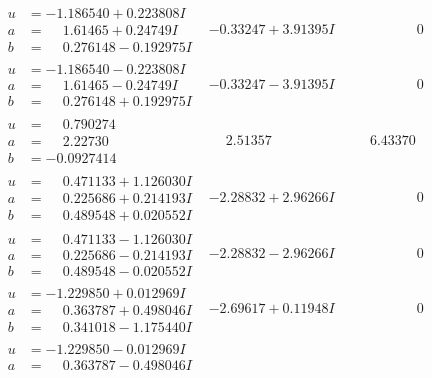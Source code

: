 \documentclass[1p]{elsarticle_modified}
\theoremstyle{definition}
\begin{document}
$$\begin{array}{c|c|c}
\begin{aligned}
u &= -1.186540 + 0.223808 I \\
a &= \phantom{-}1.61465 + 0.24749 I \\
b &= \phantom{-}0.276148 - 0.192975 I\end{aligned}
 & -0.33247 + 3.91395 I & \phantom{-0.000000 } 0 \\ \hline\begin{aligned}
u &= -1.186540 - 0.223808 I \\
a &= \phantom{-}1.61465 - 0.24749 I \\
b &= \phantom{-}0.276148 + 0.192975 I\end{aligned}
 & -0.33247 - 3.91395 I & \phantom{-0.000000 } 0 \\ \hline\begin{aligned}
u &= \phantom{-}0.790274\phantom{ +0.000000I} \\
a &= \phantom{-}2.22730\phantom{ +0.000000I} \\
b &= -0.0927414\phantom{ +0.000000I}\end{aligned}
 & \phantom{-}2.51357\phantom{ +0.000000I} & \phantom{-}6.43370\phantom{ +0.000000I} \\ \hline\begin{aligned}
u &= \phantom{-}0.471133 + 1.126030 I \\
a &= \phantom{-}0.225686 + 0.214193 I \\
b &= \phantom{-}0.489548 + 0.020552 I\end{aligned}
 & -2.28832 + 2.96266 I & \phantom{-0.000000 } 0 \\ \hline\begin{aligned}
u &= \phantom{-}0.471133 - 1.126030 I \\
a &= \phantom{-}0.225686 - 0.214193 I \\
b &= \phantom{-}0.489548 - 0.020552 I\end{aligned}
 & -2.28832 - 2.96266 I & \phantom{-0.000000 } 0 \\ \hline\begin{aligned}
u &= -1.229850 + 0.012969 I \\
a &= \phantom{-}0.363787 + 0.498046 I \\
b &= \phantom{-}0.341018 - 1.175440 I\end{aligned}
 & -2.69617 + 0.11948 I & \phantom{-0.000000 } 0 \\ \hline\begin{aligned}
u &= -1.229850 - 0.012969 I \\
a &= \phantom{-}0.363787 - 0.498046 I \\

\end{aligned}
\end{array}$$
\end{document}
